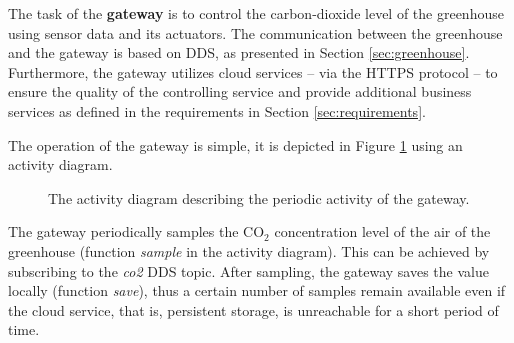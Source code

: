 \documentclass[a4paper, 11pt]{article}
\begin{document}
	The task of the \textbf{gateway} is to control the carbon-dioxide level of the greenhouse using sensor data and  its actuators. The communication between the greenhouse and the gateway is based on DDS, as presented in Section \ref{sec:greenhouse}. Furthermore, the gateway utilizes cloud services -- via the HTTPS protocol -- to ensure the quality of the controlling service and provide additional business services as defined in the requirements in Section \ref{sec:requirements}.	
	
	The operation of the gateway is simple, it is depicted in Figure \ref{fig:activity} using an activity diagram.
	
	\begin{figure}[h!]
		\center
		\caption{The activity diagram describing the periodic activity of the gateway.}
		\label{fig:activity}
	\end{figure}
	
	The gateway periodically samples the CO$_2$ concentration level of the air of the greenhouse (function \textsl{sample} in the activity diagram). This can be achieved by subscribing to the \textsl{co2} DDS topic. After sampling, the gateway saves the value locally (function \textsl{save}), thus a certain number of samples remain available even if the cloud service, that is, persistent storage, is unreachable for a short period of time. 
	
\end{document}
